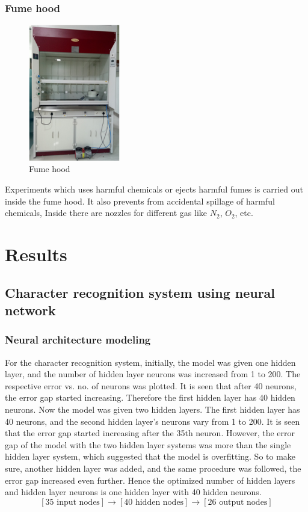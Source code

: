 \documentclass[12pt,a4paper,bold]{thesis}
\theoremstyle{thm}
\theoremstyle{definition}
\begin{document}
\subsection{Fume hood}
\begin{figure}[H]
	\centering
   \includegraphics[width=4cm]{Images/13.png} 
   \caption{Fume hood}
\end{figure}
\indent\indent\indent Experiments which uses harmful chemicals or ejects harmful fumes is carried out inside the fume hood. It also prevents from accidental spillage of harmful chemicals, Inside there are nozzles for different gas like $N_2$, $O_2$, etc. 

\chapter{Results} \label{ch: results}

\section{Character recognition system using neural network}
\subsection{Neural architecture modeling}
\indent\indent\indent For the character recognition system, initially, the model was given one hidden layer, and the number of hidden layer neurons was increased from 1 to 200. The respective error vs. no. of neurons was plotted. It is seen that after 40 neurons, the error gap started increasing. Therefore the first hidden layer has 40 hidden neurons. Now the model was given two hidden layers. The first hidden layer has 40 neurons, and the second hidden layer's neurons vary from 1 to 200. It is seen that the error gap started increasing after the 35th neuron. However, the error gap of the model with the two hidden layer systems was more than the single hidden layer system, which suggested that the model is overfitting. So to make sure, another hidden layer was added, and the same procedure was followed, the error gap increased even further. Hence the optimized number of hidden layers and hidden layer neurons is one hidden layer with 40 hidden neurons.
\[[35\text{ input nodes}] \longrightarrow [40\text{ hidden nodes}] \longrightarrow [26\text{ output nodes}]\] 
\end{document}
